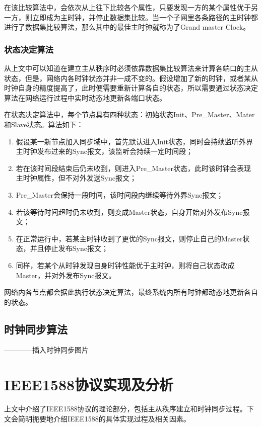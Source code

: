 在该比较算法中，会依次从上往下比较各个属性，只要发现一方的某个属性优于另一方，则立即成为主时钟，并停止数据集比较。当一个子网里各条路径的主时钟都进行了数据集比较算法，那么其中的最佳主时钟就称为了Grand master Clock。

\subsubsection{状态决定算法}
从上文中可以知道在建立主从秩序时必须依靠数据集比较算法来计算各端口的主从状态，但是，网络内各时钟状态并非一成不变的。假设增加了新的时钟，或者某从时钟自身的精度提高了，此时便需要重新计算各自的状态，所以需要通过状态决定算法在网络运行过程中实时动态地更新各端口状态。

在状态决定算法中，每个节点具有四种状态：初始状态Init、Pre\_Master、Mater和Slave状态。算法如下：
\begin{enumerate}[noitemsep,topsep=0pt,parsep=0pt,partopsep=0pt]
	\item 假设某一新节点加入同步域中，首先默认进入Init状态，同时会持续监听外界主时钟发布过来的Sync报文，该监听会持续一定时间段；
	\item 若在该时间段结束后仍未收到，则进入Pre\_Master状态，此时该时钟会表现主时钟属性，但不对外发送Sync报文；
	\item Pre\_Master会保持一段时间，该时间段内继续等待外界Sync报文；
	\item 若该等待时间超时仍未收到，则变成Master状态，自身开始对外发布Sync报文；
	\item 在正常运行中，若某主时钟收到了更优的Sync报文，则停止自己的Master状态，并且停止发布Sync报文；
	\item 同样，若某个从时钟发现自身时钟性能优于主时钟，则将自己状态改成Master，并对外发布Sync报文。
\end{enumerate}

网络内各节点都会据此执行状态决定算法，最终系统内所有时钟都动态地更新各自的状态。

\subsection{时钟同步算法}
\label{sec:1588_theory_sync}
————插入时钟同步图片

\section{IEEE1588协议实现及分析}
上文中介绍了IEEE1588协议的理论部分，包括主从秩序建立和时钟同步过程。下文会简明扼要地介绍IEEE1588的具体实现过程及相关因素。

